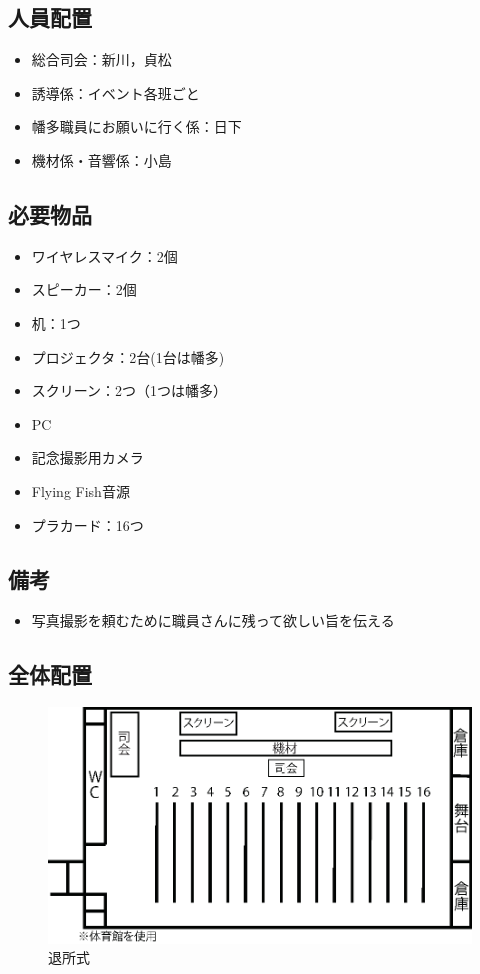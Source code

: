 \subsection{人員配置}
\begin{itemize}
\item 総合司会：新川，貞松
\item 誘導係：イベント各班ごと
\item 幡多職員にお願いに行く係：日下
\item 機材係・音響係：小島
\end{itemize}

\newpage

\subsection{必要物品}
\begin{itemize}
\item ワイヤレスマイク：2個
\item スピーカー：2個
\item 机：1つ
\item プロジェクタ：2台(1台は幡多)
\item スクリーン：2つ（1つは幡多）
\item PC
\item 記念撮影用カメラ
\item Flying Fish音源
\item プラカード：16つ
\end{itemize}
\subsection{備考}
\begin{itemize}
\item 写真撮影を頼むために職員さんに残って欲しい旨を伝える
\end{itemize}

\subsection{全体配置}
\begin{figure}[htbp]
  \begin{center}
  \includegraphics[width = 15cm]{./24/hyousyou.eps}
  \caption{退所式}
  \end{center}
\end{figure}

%
